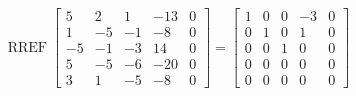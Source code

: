 \begin{exerciseAnswer} 


\[\operatorname{RREF} \left[\begin{array}{cccc|c}
5 & 2 & 1 & -13 & 0 \\
1 & -5 & -1 & -8 & 0 \\
-5 & -1 & -3 & 14 & 0 \\
5 & -5 & -6 & -20 & 0 \\
3 & 1 & -5 & -8 & 0
\end{array}\right] = \left[\begin{array}{cccc|c}
1 & 0 & 0 & -3 & 0 \\
0 & 1 & 0 & 1 & 0 \\
0 & 0 & 1 & 0 & 0 \\
0 & 0 & 0 & 0 & 0 \\
0 & 0 & 0 & 0 & 0
\end{array}\right] \]



\end{exerciseAnswer}
